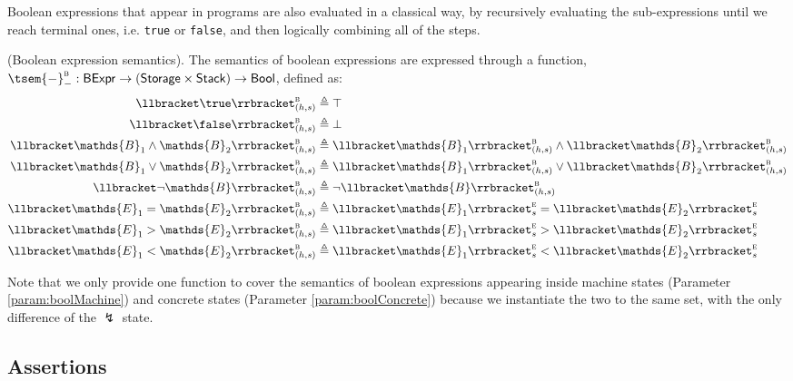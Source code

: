 Boolean expressions that appear in programs are also evaluated in a classical way, by recursively evaluating the sub-expressions until we reach terminal ones, i.e. \texttt{true} or \texttt{false}, and then logically combining all of the steps.
\begin{defn}
	(Boolean expression semantics).
	The semantics of boolean expressions are expressed through a function, $\tsem{-}_-^\textsc{b} : \mathsf{BExpr} \rightarrow (\mathsf{Storage} \times \mathsf{Stack}) \rightarrow \mathsf{Bool}$, defined as:
	\begin{align*}
		\llbracket \true \rrbracket_{(h, s)}^\textsc{b} &\triangleq \top \\
		\llbracket \false \rrbracket_{(h, s)}^\textsc{b} &\triangleq \bot \\
		\llbracket \mathds{B}_1 \land \mathds{B}_2 \rrbracket_{(h, s)}^\textsc{b} &\triangleq \llbracket \mathds{B}_1 \rrbracket_{(h, s)}^\textsc{b} \land \llbracket \mathds{B}_2 \rrbracket_{(h, s)}^\textsc{b} \\
		\llbracket \mathds{B}_1 \lor \mathds{B}_2 \rrbracket_{(h, s)}^\textsc{b} &\triangleq \llbracket \mathds{B}_1 \rrbracket_{(h, s)}^\textsc{b} \lor \llbracket \mathds{B}_2 \rrbracket_{(h, s)}^\textsc{b} \\
		\llbracket \lnot \mathds{B} \rrbracket_{(h, s)}^\textsc{b} &\triangleq \lnot \llbracket \mathds{B} \rrbracket_{(h, s)}^\textsc{b} \\
		\llbracket \mathds{E}_1 = \mathds{E}_2 \rrbracket_{(h, s)}^\textsc{b} &\triangleq \llbracket \mathds{E}_1 \rrbracket_{s}^\textsc{e} = \llbracket \mathds{E}_2 \rrbracket_{s}^\textsc{e} \\
		\llbracket \mathds{E}_1 > \mathds{E}_2 \rrbracket_{(h, s)}^\textsc{b} &\triangleq \llbracket \mathds{E}_1 \rrbracket_{s}^\textsc{e} > \llbracket \mathds{E}_2 \rrbracket_{s}^\textsc{e} \\
		\llbracket \mathds{E}_1 < \mathds{E}_2 \rrbracket_{(h, s)}^\textsc{b} &\triangleq \llbracket \mathds{E}_1 \rrbracket_{s}^\textsc{e} < \llbracket \mathds{E}_2 \rrbracket_{s}^\textsc{e}
	\end{align*}
\end{defn}
Note that we only provide one function to cover the semantics of boolean expressions appearing inside machine states (Parameter \ref{param:boolMachine}) and concrete states (Parameter \ref{param:boolConcrete}) because we instantiate the two to the same set, with the only difference of the $\lightning$ state.

\subsection{Assertions}

